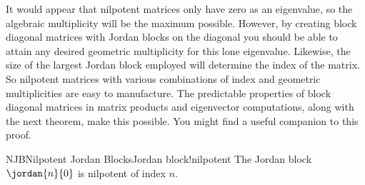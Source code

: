 %
It would appear that nilpotent matrices only have zero as an eigenvalue, so the algebraic multiplicity will be the maximum possible.  However, by creating block diagonal matrices with Jordan blocks on the diagonal you should be able to attain any desired geometric multiplicity for this lone eigenvalue.  Likewise, the size of the largest Jordan block employed will determine the index of the matrix. So nilpotent matrices with various combinations of index and geometric multiplicities are easy to manufacture.  The predictable properties of block diagonal matrices in matrix products and eigenvector computations, along with the next theorem, make this possible.  You might find  a useful companion to this proof.
%
\begin{theorem}{NJB}{Nilpotent Jordan Blocks}{Jordan block!nilpotent}
The Jordan block $\jordan{n}{0}$ is nilpotent of index $n$.
\end{theorem}
%
